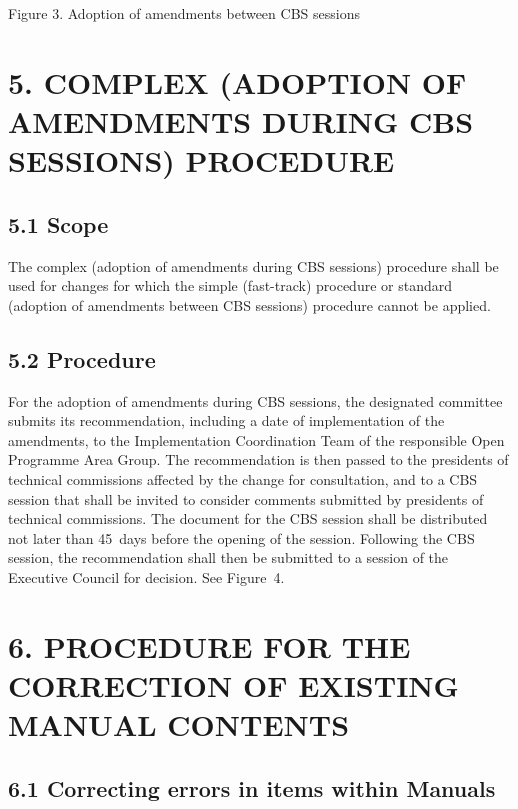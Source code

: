 Figure 3. Adoption of amendments between CBS sessions

\hypertarget{complex-adoption-of-amendments-during-cbs-sessions-procedure}{%
\section{5. COMPLEX (ADOPTION OF AMENDMENTS DURING CBS SESSIONS) PROCEDURE}\label{complex-adoption-of-amendments-during-cbs-sessions-procedure}}

\hypertarget{scope-2}{%
\subsection{5.1 Scope}\label{scope-2}}

The complex (adoption of amendments during CBS sessions) procedure shall be used for changes for which the simple (fast-track) procedure or standard (adoption of amendments between CBS sessions) procedure cannot be applied.

\hypertarget{procedure}{%
\subsection{5.2 Procedure}\label{procedure}}

For the adoption of amendments during CBS sessions, the designated committee submits its recommendation, including a date of implementation of the amendments, to the Implementation Coordination Team of the responsible Open Programme Area Group. The recommendation is then passed to the presidents of technical commissions affected by the change for consultation, and to a CBS session that shall be invited to consider comments submitted by presidents of technical commissions. The document for the CBS session shall be distributed not later than 45~days before the opening of the session. Following the CBS session, the recommendation shall then be submitted to a session of the Executive Council for decision. See Figure~4.

\hypertarget{procedure-for-the-correction-of-existing-manual-contents}{%
\section{6. PROCEDURE FOR THE CORRECTION OF EXISTING MANUAL CONTENTS}\label{procedure-for-the-correction-of-existing-manual-contents}}

\hypertarget{correcting-errors-in-items-within-manuals}{%
\subsection{6.1 Correcting errors in items within Manuals }\label{correcting-errors-in-items-within-manuals}}

